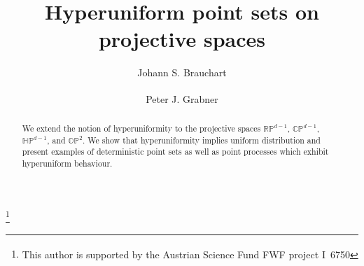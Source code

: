 \documentclass[12pt]{amsart}
\theoremstyle{definition}
\begin{document}
\title[]{Hyperuniform point sets on projective spaces}

\author{Johann S. Brauchart}
\address{Institute of Analysis and Number Theory,
  Graz University of Technology,
  Kopernikusgasse 24.
8010 Graz,
Austria}


\author{Peter J. Grabner\textsuperscript{\ddag}}
\thanks{\textsuperscript{\ddag} This author is supported by the Austrian
  Science Fund FWF project I~6750}
\maketitle
\begin{abstract}
  We extend the notion of hyperuniformity to the projective spaces
  $\mathbb{RP}^{d-1}$, $\mathbb{CP}^{d-1}$, $\mathbb{HP}^{d-1}$, and
  $\mathbb{OP}^2$. We show that hyperuniformity implies uniform distribution
  and present examples of deterministic point sets as well as point processes
  which exhibit hyperuniform behaviour.
\end{abstract}






\end{document}
